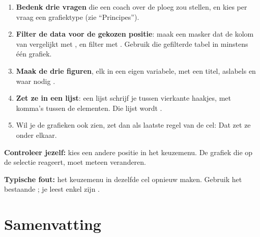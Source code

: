 \documentclass[11pt,a4paper]{article}
\begin{document}
\begin{enumerate}
  \item \textbf{Bedenk drie vragen} die een coach over de ploeg zou
        stellen, en kies per vraag een grafiektype (zie ``Principes'').
  \item \textbf{Filter de data voor de gekozen positie}: maak een masker
        dat de kolom  van  vergelijkt met
        , en filter met .
        Gebruik die gefilterde tabel in minstens één grafiek.
  \item \textbf{Maak de drie figuren}, elk in een eigen variabele, met een
        titel, aslabels en waar nodig .
  \item \textbf{Zet ze in een lijst}: een lijst schrijf je tussen
        vierkante haakjes, met komma's tussen de elementen. Die lijst
        wordt .
  \item Wil je de grafieken ook zien, zet dan als laatste regel van de cel:\newline
        \newline Dat zet ze onder elkaar.
\end{enumerate}

\textbf{Controleer jezelf:} kies een andere positie in het keuzemenu. De
grafiek die op de selectie reageert, moet meteen veranderen.

\textbf{Typische fout:} het keuzemenu in dezelfde cel opnieuw maken.
Gebruik het bestaande ; je leest enkel zijn
.

\section{Samenvatting}
\end{document}
